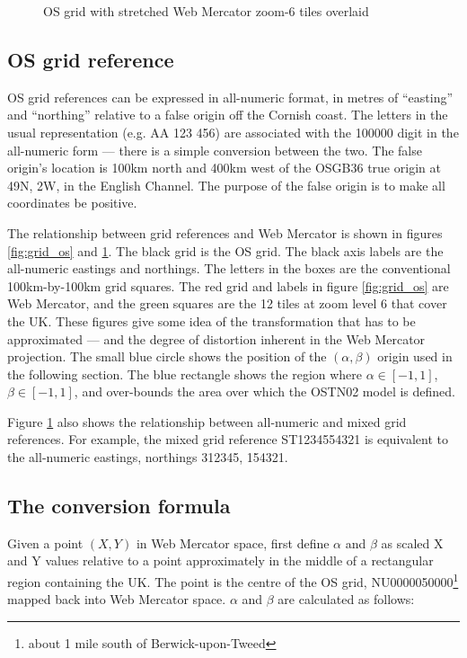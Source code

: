 \documentclass[10pt,a4paper]{article}
\def\tkname#1{}
\begin{document}
\begin{figure}[t]
  \centering
  \tkname{grid_wm}
  \fbox{
    
  }
  \caption{OS grid with stretched Web Mercator zoom-6 tiles overlaid}
  \label{fig:grid_wm}
\end{figure}


\subsection {OS grid reference}
OS grid references can be expressed in all-numeric format, in metres of
``easting'' and ``northing'' relative to a false origin off the Cornish coast.
The letters in the usual representation (e.g. AA 123 456) are associated with
the 100000 digit in the all-numeric form --- there is a simple conversion
between the two.  The false origin's location is 100km north and 400km west of
the OSGB36 true origin at 49N, 2W, in the English Channel.  The purpose of the
false origin is to make all coordinates be positive.

The relationship between grid references and Web Mercator is shown in figures
\ref{fig:grid_os} and \ref{fig:grid_wm}.  The black grid is the OS grid.  The
black axis labels are the all-numeric eastings and northings. The letters in
the boxes are the conventional 100km-by-100km grid squares.  The red grid and
labels in figure \ref{fig:grid_os} are Web Mercator, and the green squares are
the 12 tiles at zoom level 6 that cover the UK.  These figures give some idea
of the transformation that has to be approximated --- and the degree of
distortion inherent in the Web Mercator projection.  The small blue circle
shows the position of the $(\alpha,\beta)$ origin used in the following
section.  The blue rectangle shows the region where $\alpha \in [-1,1]$, $\beta
\in [-1,1]$, and over-bounds the area over which the OSTN02 model is defined.

Figure \ref{fig:grid_wm} also shows the relationship between all-numeric and
mixed grid references.  For example, the mixed grid reference ST1234554321 is
equivalent to the all-numeric eastings, northings 312345, 154321.


\subsection {The conversion formula}
Given a point $(X,Y)$ in Web Mercator space, first define $\alpha$ and $\beta$
as scaled X and Y values relative to a point approximately in the middle of a
rectangular region containing the UK.  The point is the centre of the OS grid,
NU0000050000\footnote{about 1 mile south of Berwick-upon-Tweed} mapped back
into Web Mercator space.  $\alpha$ and $\beta$ are calculated as follows:
\end{document}

